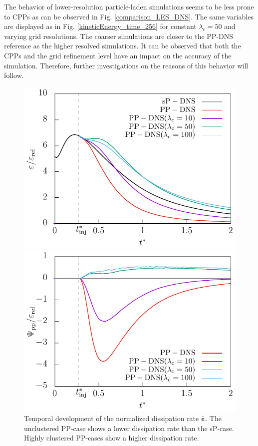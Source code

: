 \documentclass[11pt,a4paper,openany,oneside,parskip=half*]{article}
\renewcommand*\vec[1]{\boldsymbol{#1}}
\begin{document}
The behavior of lower-resolution particle-laden simulations seems to be less prone to CPPs as can be observed in Fig. \ref{comparison_LES_DNS}. The same variables are displayed as in Fig. \ref{kineticEnergy_time_256} for constant $\lambda_\mathrm{c}=50$ and varying grid resolutions. The coarser simulations are closer to the PP-DNS reference as the higher resolved simulations.
It can be observed that both the CPPs and the grid refinement level have an impact on the accuracy of the simulation. Therefore, further investigations on the reasons of this behavior will follow.
\begin{figure}[htb]
    \centering
    \begin{minipage}[]{0.5\textwidth}
         \centering
        \includegraphics[width=\linewidth]{./Abbildungen/256/diss_time.pdf}
        \caption{Temporal development of the normalized dissipation rate $\bar{\vec{\varepsilon}}$. The unclustered PP-case shows a lower dissipation rate than the sP-case. Highly clustered PP-cases show a higher dissipation rate.}
        \label{diss_time_256}
    \end{minipage}%
    \begin{minipage}[]{0.5\textwidth}
        \centering
        \includegraphics[width=\linewidth]{./Abbildungen/256/coupling_time.pdf}

\end{minipage}
\end{figure}
\end{document}
